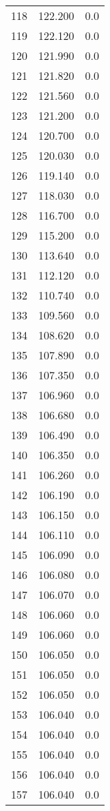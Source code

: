 \begin{tabular}{lrr}
118 &  122.200 &   0.0 \\
119 &  122.120 &   0.0 \\
120 &  121.990 &   0.0 \\
121 &  121.820 &   0.0 \\
122 &  121.560 &   0.0 \\
123 &  121.200 &   0.0 \\
124 &  120.700 &   0.0 \\
125 &  120.030 &   0.0 \\
126 &  119.140 &   0.0 \\
127 &  118.030 &   0.0 \\
128 &  116.700 &   0.0 \\
129 &  115.200 &   0.0 \\
130 &  113.640 &   0.0 \\
131 &  112.120 &   0.0 \\
132 &  110.740 &   0.0 \\
133 &  109.560 &   0.0 \\
134 &  108.620 &   0.0 \\
135 &  107.890 &   0.0 \\
136 &  107.350 &   0.0 \\
137 &  106.960 &   0.0 \\
138 &  106.680 &   0.0 \\
139 &  106.490 &   0.0 \\
140 &  106.350 &   0.0 \\
141 &  106.260 &   0.0 \\
142 &  106.190 &   0.0 \\
143 &  106.150 &   0.0 \\
144 &  106.110 &   0.0 \\
145 &  106.090 &   0.0 \\
146 &  106.080 &   0.0 \\
147 &  106.070 &   0.0 \\
148 &  106.060 &   0.0 \\
149 &  106.060 &   0.0 \\
150 &  106.050 &   0.0 \\
151 &  106.050 &   0.0 \\
152 &  106.050 &   0.0 \\
153 &  106.040 &   0.0 \\
154 &  106.040 &   0.0 \\
155 &  106.040 &   0.0 \\
156 &  106.040 &   0.0 \\
157 &  106.040 &   0.0 \\

\end{tabular}
